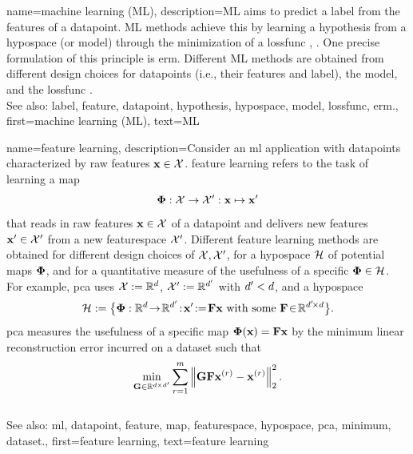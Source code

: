 {name={machine learning (ML)},
	description={ML aims to predict 
	 	a \gls{label} from the \glspl{feature} of a \gls{datapoint}. ML methods achieve 
	 	this by learning a \gls{hypothesis} from a \gls{hypospace} (or \gls{model}) 
	 	through the minimization of a \gls{lossfunc} \cite{MLBasics}, \cite{HastieWainwrightBook}. 
	 	One precise formulation of this principle is \gls{erm}. Different ML methods are 
	 	obtained from different design choices for \glspl{datapoint} (i.e., their \glspl{feature} and \gls{label}), 
	 	the \gls{model}, and the \gls{lossfunc} \cite[Ch. 3]{MLBasics}.
	 			\\ 
		See also: \gls{label}, \gls{feature}, \gls{datapoint}, \gls{hypothesis}, \gls{hypospace}, \gls{model}, \gls{lossfunc}, \gls{erm}.},
	first={machine learning (ML)},
	text={ML}
} 


{name={feature learning},
	description={Consider an \gls{ml} application with \glspl{datapoint} characterized by 
		raw \glspl{feature} ${\bf x} \in \mathcal{X}$. \Gls{feature} learning 
		refers to the task of learning a \gls{map} 
		$${\bf \Phi}: \mathcal{X} \rightarrow \mathcal{X}': {\bf x} \mapsto {\bf x}'$$ 
		that reads in raw \glspl{feature} ${\bf x} \in \mathcal{X}$ of a \gls{datapoint} and delivers new 
		\glspl{feature} ${\bf x}' \in \mathcal{X}'$ from a new \gls{featurespace} $\mathcal{X}'$. 
		Different \gls{feature} learning methods are obtained for different design 
		choices of $\mathcal{X},\mathcal{X}'$, for a \gls{hypospace} $\mathcal{H}$ 
		of potential \glspl{map} ${\bf \Phi}$, and for a quantitative measure of the usefulness of 
		a specific ${\bf \Phi} \in \mathcal{H}$. For example, \gls{pca} 
		uses $\mathcal{X} := \mathbb{R}^{d}$, $\mathcal{X}' := \mathbb{R}^{d'}$ 
		with $d' < d$, and a \gls{hypospace} 
		$$\hypospace\defeq \big\{ \featuremapvec: \mathbb{R}^{\dimlocalmodel}
		\!\rightarrow\! \mathbb{R}^{\dimlocalmodel'}\!:\!\featurevec'\!\defeq\!\mF \featurevec \mbox{ with some } \mF \!\in\! \mathbb{R}^{\dimlocalmodel' \!\times \dimlocalmodel} \big\}.$$ \Gls{pca} measures the usefulness of a specific \gls{map} ${\bf \Phi}({\bf x})= \mathbf{F} {\bf x}$ 
	by the \gls{minimum} linear reconstruction error incurred on a \gls{dataset} such that 
$$\min_{\mG \in \mathbb{R}^{\dimlocalmodel \!\!\!\times \dimlocalmodel'}} \sum_{\sampleidx=1}^{\samplesize} \normgeneric{\mG \mF \featurevec^{(\sampleidx)} - \featurevec^{(\sampleidx)}}{2}^{2}.$$ 
			\\ 
		See also: \gls{ml}, \gls{datapoint}, \gls{feature}, \gls{map}, \gls{featurespace}, \gls{hypospace}, \gls{pca}, \gls{minimum}, \gls{dataset}.}, 
	first={feature learning},
	text={feature learning}
} 

